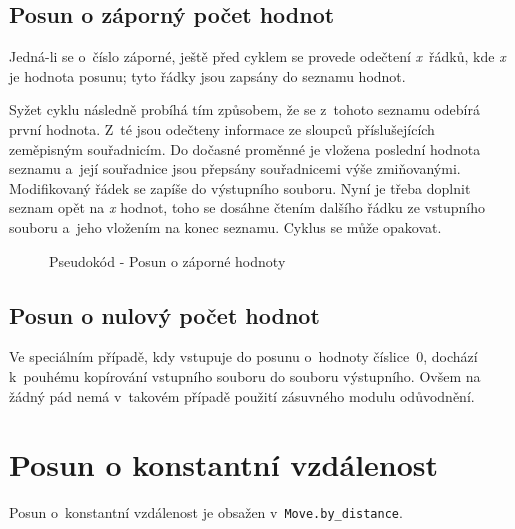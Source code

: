 \subsection{Posun o záporný počet hodnot}
\label{zapornehodnoty}

Jedná-li se o~číslo záporné, ještě před cyklem se provede odečtení \textit{x}~řádků,
kde \textit{x} je hodnota posunu; tyto řádky jsou zapsány do seznamu hodnot.

Syžet cyklu následně probíhá
tím způsobem, že se z~tohoto seznamu odebírá první hodnota. Z~té jsou odečteny informace ze
sloupců příslušejících zeměpisným souřadnicím. Do dočasné proměnné je vložena poslední
hodnota seznamu a~její souřadnice jsou pře\-psány souřadnicemi výše zmiňovanými. Modifikovaný řádek
se zapíše do výstupního souboru. Nyní je třeba doplnit seznam opět na \textit{x} hodnot, toho
se dosáhne čtením dalšího řádku ze vstupního souboru a~jeho vložením na konec seznamu. Cyklus
se může opakovat. 

    \begin{figure}
    \centering
    \begin{algorithmic}[1]
    \ENDWHILE
    \end{algorithmic}
    \caption{Pseudokód - Posun o záporné hodnoty}
    \label{fig:pseudozapornehodnoty}
    \end{figure}

\subsection{Posun o nulový počet hodnot}
\label{nulovehodnoty}

Ve speciálním případě, kdy vstupuje do posunu o~hodnoty číslice~0,
dochází k~pouhé\-mu kopírování vstupního
souboru do souboru výstupního. Ovšem na žádný pád nemá v~takovém případě použití zásuvného modulu
odůvodnění. 

\section{Posun o konstantní vzdálenost}
\label{by_distance}

Posun o~konstantní vzdálenost je obsažen v~{\tt Move.by\_distance}. 

